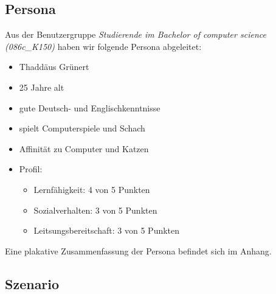 \documentclass{article}
\begin{document}
\newpage

\subsection{Persona}

Aus der Benutzergruppe \textit{Studierende im Bachelor of computer science (086c\_K150)} haben wir folgende Persona abgeleitet:
\begin{itemize}
\item Thaddäus Grünert
\item 25 Jahre alt
\item gute Deutsch- und Englischkenntnisse
\item spielt Computerspiele und Schach
\item Affinität zu Computer und Katzen
\item Profil:
	\begin{itemize}
	\item Lernfähigkeit: 4 von 5 Punkten
	\item Sozialverhalten: 3 von 5 Punkten
	\item Leitsungsbereitschaft: 3 von 5 Punkten
	\end{itemize}
\end{itemize}
Eine plakative Zusammenfassung der Persona befindet sich im Anhang.

\newpage

\subsection{Szenario}
\end{document}
